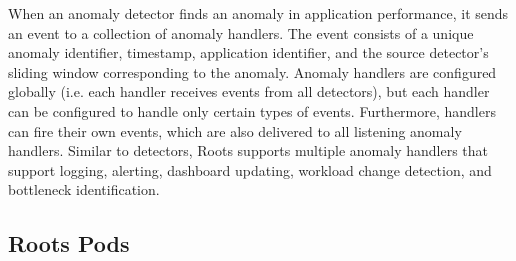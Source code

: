 When an anomaly detector finds an anomaly in application performance, it sends an event
to a collection of anomaly handlers. The event consists of a unique anomaly identifier, 
timestamp, application identifier, and the source detector's sliding window corresponding to the
anomaly. Anomaly handlers are configured globally (i.e. each handler
receives events from all detectors), but each handler can be configured to handle only
certain types of events. Furthermore, handlers can fire their own events, which are also delivered to
all listening anomaly handlers. Similar to detectors, Roots supports multiple anomaly handlers
that support logging, alerting, dashboard updating, 
workload change detection, and bottleneck identification.




\subsection{Roots Pods}
\label{sec:process_mgt}

